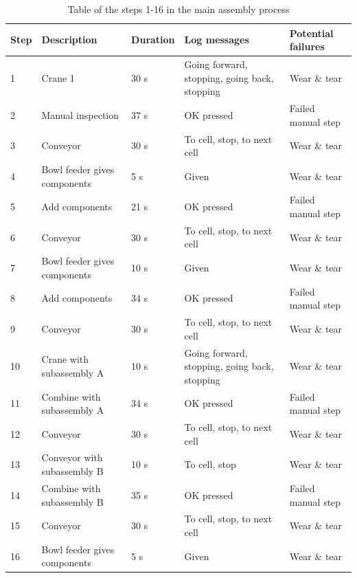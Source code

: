 \documentclass[journal]{IEEEtran}
\begin{document}
\begin{table}[!t]
\renewcommand{\arraystretch}{1.3}
\caption{Table of the steps 1-16 in the main assembly process}
\label{mainsteps1}
\centering
\begin{tabular}{|p{5mm}|p{20mm}|p{10mm}|p{15mm}|p{15mm}|}
\hline
Step & Description & Duration & Log messages & Potential failures \\
\hline
\hline
1 & Crane 1 & 30 s & Going forward, stopping, going back, stopping & Wear \& tear \\
\hline
2 & Manual inspection & 37 s & OK pressed & Failed manual step \\
\hline
3 & Conveyor & 30 s & To cell, stop, to next cell & Wear \& tear \\
\hline
4 & Bowl feeder gives components & 5 s & Given & Wear \& tear \\
\hline
5 & Add components & 21 s & OK pressed & Failed manual step \\
\hline
6 & Conveyor & 30 s & To cell, stop, to next cell & Wear \& tear \\
\hline
7 & Bowl feeder gives components & 10 s & Given & Wear \& tear \\
\hline
8 & Add components & 34 s & OK pressed & Failed manual step \\
\hline
9 & Conveyor & 30 s & To cell, stop, to next cell & Wear \& tear \\
\hline
10 & Crane with subassembly A & 10 s & Going forward, stopping, going back, stopping & Wear \& tear \\
\hline
11 & Combine with subassembly A & 34 s & OK pressed & Failed manual step \\
\hline
12 & Conveyor & 30 s & To cell, stop, to next cell & Wear \& tear \\
\hline
13 & Conveyor with subassembly B & 10 s & To cell, stop & Wear \& tear \\
\hline
14 & Combine with subassembly B & 35 s & OK pressed & Failed manual step \\
\hline
15 & Conveyor & 30 s & To cell, stop, to next cell & Wear \& tear \\
\hline
16 & Bowl feeder gives components & 5 s & Given & Wear \& tear \\
\hline
\end{tabular}
\end{table}
\end{document}
